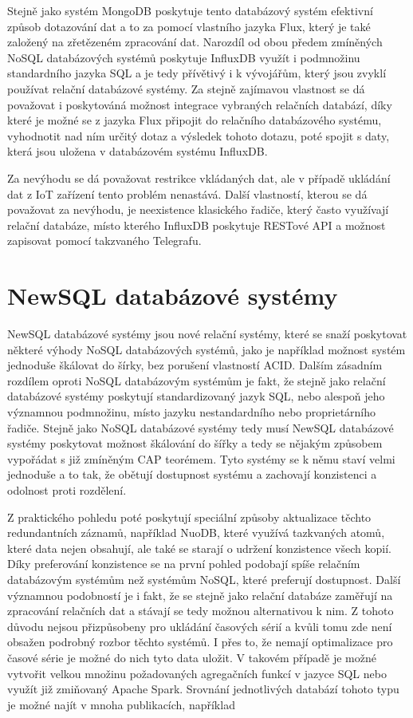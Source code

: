 Stejně jako systém MongoDB poskytuje tento databázový systém efektivní způsob dotazování dat a to za pomocí vlastního jazyka Flux, který je také založený na zřetězeném zpracování dat. Narozdíl od obou předem zmíněných NoSQL databázových systémů poskytuje InfluxDB využít i podmnožinu standardního jazyka SQL a je tedy přívětivý i k vývojářům, který jsou zvyklí používat relační databázové systémy. Za stejně zajímavou vlastnost se dá považovat i poskytováná možnost integrace vybraných relačních databází, díky které je možné se z jazyka Flux připojit do relačního databázového systému, vyhodnotit nad ním určitý dotaz a výsledek tohoto dotazu, poté spojit s daty, která jsou uložena v databázovém systému InfluxDB. 

Za nevýhodu se dá považovat restrikce vkládaných dat, ale v případě ukládání dat z IoT zařízení tento problém nenastává. Další vlastností, kterou se dá považovat za nevýhodu, je neexistence klasického řadiče, který často využívají relační databáze, místo kterého InfluxDB poskytuje RESTové API a možnost zapisovat pomocí takzvaného Telegrafu.

\section{NewSQL databázové systémy}
NewSQL databázové systémy jsou nové relační systémy, které se snaží poskytovat některé výhody NoSQL databázových systémů, jako je například možnost systém jednoduše škálovat do šírky, bez porušení vlastností ACID. Dalším zásadním rozdílem oproti NoSQL databázovým systémům je fakt, že stejně jako relační databázové systémy poskytují standardizovaný jazyk SQL, nebo alespoň jeho významnou podmnožinu, místo jazyku nestandardního nebo proprietárního řadiče. Stejně jako NoSQL databázové systémy tedy musí NewSQL databázové systémy poskytovat možnost škálování do šířky a tedy se nějakým způsobem vypořádat s již zmíněným CAP teorémem. Tyto systémy se k němu staví velmi jednoduše a to tak, že obětují dostupnost systému a zachovají konzistenci a odolnost proti rozdělení.

Z praktického pohledu poté poskytují speciální způsoby aktualizace těchto redundantních záznamů, například NuoDB, které využívá tazkvaných atomů, které data nejen obsahují, ale také se starají o udržení konzistence všech kopií. Díky preferování konzistence se na první pohled podobají spíše relačním databázovým systémům než systémům NoSQL, které preferují dostupnost. Další významnou podobností je i fakt, že se stejně jako relační databáze zaměřují na zpracování relačních dat a stávají se tedy možnou alternativou k nim. Z tohoto důvodu nejsou přizpůsobeny pro ukládání časových sérií a kvůli tomu zde není obsažen podrobný rozbor těchto systémů. I přes to, že nemají optimalizace pro časové série je možné do nich tyto data uložit. V takovém případě je možné vytvořit velkou množinu požadovaných agregačních funkcí v jazyce SQL nebo využít již zmiňovaný Apache Spark. Srovnání jednotlivých databází tohoto typu je možné najít v mnoha publikacích, například \cite{8068585, 9078970}

